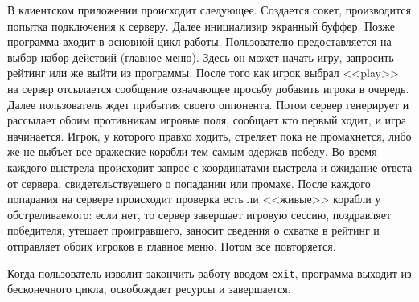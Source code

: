 \documentclass[12pt]{article}
\begin{document}
В клиентском приложении происходит следующее. Создается сокет, производится попытка подключения к серверу. Далее инициализир экранный буффер. Позже программа входит в основной цикл работы. Пользователю предоставляется на выбор набор действий (главное меню). Здесь он может начать игру, запросить рейтинг или же выйти из программы. После того как игрок выбрал <<play>> на сервер отсылается сообщение означающее просьбу добавить игрока в очередь. Далее пользователь ждет прибытия своего оппонента. Потом сервер генерирует и рассылает обоим противникам игровые поля, сообщает кто первый ходит, и игра начинается. Игрок, у которого правхо ходить, стреляет пока не промахнется, либо же не выбъет все вражеские корабли тем самым одержав победу. Во время каждого выстрела происходит запрос с координатами выстрела и ожидание ответа от сервера, свидетельствуещего о попадании или промахе. После каждого попадания на сервере происходит проверка есть ли <<живые>> корабли у обстреливаемого: если нет, то сервер завершает игровую сессию, поздравляет победителя, утешает проигравшего, заносит сведения о схватке в рейтинг и отправляет обоих игроков в главное меню. Потом все повторяется.

Когда пользователь изволит закончить работу вводом \verb|exit|, программа выходит из бесконечного цикла, освобождает ресурсы и завершается.
\end{document}
